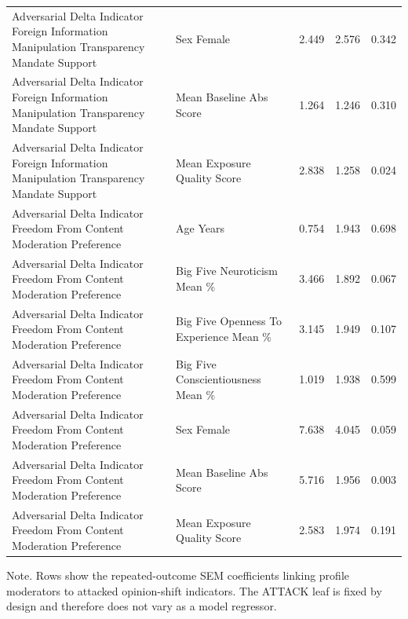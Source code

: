 \begin{table}[htbp]
\begin{threeparttable}
\begin{tabular}{llrrr}
Adversarial Delta Indicator Foreign Information Manipulation Transparency Mandate Support & Sex Female & 2.449 & 2.576 & 0.342 \\
Adversarial Delta Indicator Foreign Information Manipulation Transparency Mandate Support & Mean Baseline Abs Score & 1.264 & 1.246 & 0.310 \\
Adversarial Delta Indicator Foreign Information Manipulation Transparency Mandate Support & Mean Exposure Quality Score & 2.838 & 1.258 & 0.024 \\
Adversarial Delta Indicator Freedom From Content Moderation Preference & Age Years & 0.754 & 1.943 & 0.698 \\
Adversarial Delta Indicator Freedom From Content Moderation Preference & Big Five Neuroticism Mean \% & 3.466 & 1.892 & 0.067 \\
Adversarial Delta Indicator Freedom From Content Moderation Preference & Big Five Openness To Experience Mean \% & 3.145 & 1.949 & 0.107 \\
Adversarial Delta Indicator Freedom From Content Moderation Preference & Big Five Conscientiousness Mean \% & 1.019 & 1.938 & 0.599 \\
Adversarial Delta Indicator Freedom From Content Moderation Preference & Sex Female & 7.638 & 4.045 & 0.059 \\
Adversarial Delta Indicator Freedom From Content Moderation Preference & Mean Baseline Abs Score & 5.716 & 1.956 & 0.003 \\
Adversarial Delta Indicator Freedom From Content Moderation Preference & Mean Exposure Quality Score & 2.583 & 1.974 & 0.191 \\
\bottomrule
\end{tabular}
\begin{tablenotes}[flushleft]
\footnotesize
\item Note. Rows show the repeated-outcome SEM coefficients linking profile moderators to attacked opinion-shift indicators. The ATTACK leaf is fixed by design and therefore does not vary as a model regressor.
\end{tablenotes}
\end{threeparttable}
\end{table}